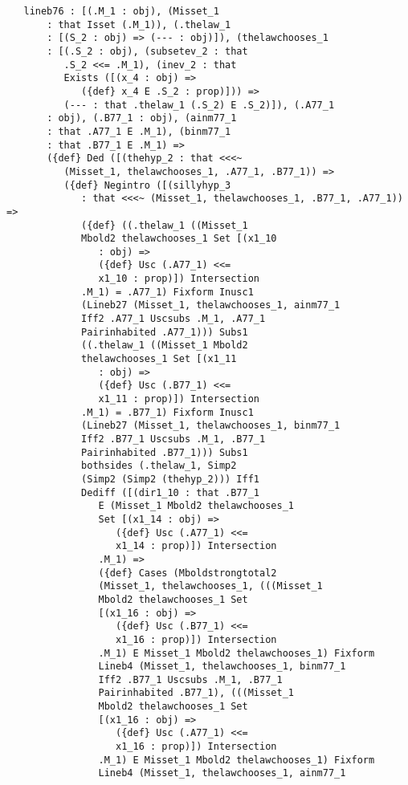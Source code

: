 \documentclass[12pt]{article}
\begin{document}
\begin{verbatim}
   lineb76 : [(.M_1 : obj), (Misset_1 
       : that Isset (.M_1)), (.thelaw_1 
       : [(S_2 : obj) => (--- : obj)]), (thelawchooses_1 
       : [(.S_2 : obj), (subsetev_2 : that 
          .S_2 <<= .M_1), (inev_2 : that 
          Exists ([(x_4 : obj) => 
             ({def} x_4 E .S_2 : prop)])) => 
          (--- : that .thelaw_1 (.S_2) E .S_2)]), (.A77_1 
       : obj), (.B77_1 : obj), (ainm77_1 
       : that .A77_1 E .M_1), (binm77_1 
       : that .B77_1 E .M_1) => 
       ({def} Ded ([(thehyp_2 : that <<<~ 
          (Misset_1, thelawchooses_1, .A77_1, .B77_1)) => 
          ({def} Negintro ([(sillyhyp_3 
             : that <<<~ (Misset_1, thelawchooses_1, .B77_1, .A77_1)) => 
             ({def} ((.thelaw_1 ((Misset_1 
             Mbold2 thelawchooses_1 Set [(x1_10 
                : obj) => 
                ({def} Usc (.A77_1) <<= 
                x1_10 : prop)]) Intersection 
             .M_1) = .A77_1) Fixform Inusc1 
             (Lineb27 (Misset_1, thelawchooses_1, ainm77_1 
             Iff2 .A77_1 Uscsubs .M_1, .A77_1 
             Pairinhabited .A77_1))) Subs1 
             ((.thelaw_1 ((Misset_1 Mbold2 
             thelawchooses_1 Set [(x1_11 
                : obj) => 
                ({def} Usc (.B77_1) <<= 
                x1_11 : prop)]) Intersection 
             .M_1) = .B77_1) Fixform Inusc1 
             (Lineb27 (Misset_1, thelawchooses_1, binm77_1 
             Iff2 .B77_1 Uscsubs .M_1, .B77_1 
             Pairinhabited .B77_1))) Subs1 
             bothsides (.thelaw_1, Simp2 
             (Simp2 (Simp2 (thehyp_2))) Iff1 
             Dediff ([(dir1_10 : that .B77_1 
                E (Misset_1 Mbold2 thelawchooses_1 
                Set [(x1_14 : obj) => 
                   ({def} Usc (.A77_1) <<= 
                   x1_14 : prop)]) Intersection 
                .M_1) => 
                ({def} Cases (Mboldstrongtotal2 
                (Misset_1, thelawchooses_1, (((Misset_1 
                Mbold2 thelawchooses_1 Set 
                [(x1_16 : obj) => 
                   ({def} Usc (.B77_1) <<= 
                   x1_16 : prop)]) Intersection 
                .M_1) E Misset_1 Mbold2 thelawchooses_1) Fixform 
                Lineb4 (Misset_1, thelawchooses_1, binm77_1 
                Iff2 .B77_1 Uscsubs .M_1, .B77_1 
                Pairinhabited .B77_1), (((Misset_1 
                Mbold2 thelawchooses_1 Set 
                [(x1_16 : obj) => 
                   ({def} Usc (.A77_1) <<= 
                   x1_16 : prop)]) Intersection 
                .M_1) E Misset_1 Mbold2 thelawchooses_1) Fixform 
                Lineb4 (Misset_1, thelawchooses_1, ainm77_1 

\end{verbatim}
\end{document}
